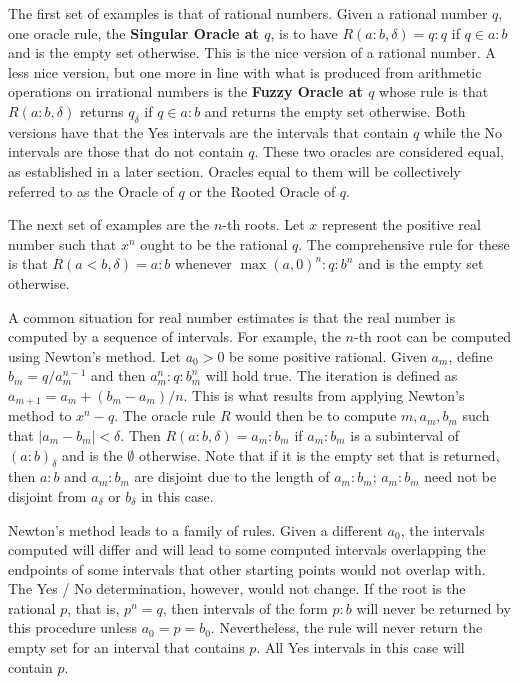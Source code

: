 \documentclass[12pt]{article}
\begin{document}
The first set of examples is that of rational numbers. Given a rational number $q$, one oracle rule, the \textbf{Singular Oracle at $q$}, is to have  $R(a:b, \delta) = q:q$ if $q \in a:b$ and is the empty set otherwise. This is the nice version of a rational number. A less nice version, but one more in line with what is produced from arithmetic operations on irrational numbers is the \textbf{Fuzzy Oracle at $q$} whose rule is that $R(a:b, \delta)$ returns $q_\delta$ if $q \in a:b$ and returns the empty set otherwise. Both versions have that the Yes intervals are the intervals that contain $q$ while the No intervals are those that do not contain $q$. These two oracles are considered equal, as established in a later section. Oracles equal to them will be collectively referred to as the Oracle of $q$ or the Rooted Oracle of $q$.  

The next set of examples are the $n$-th roots. Let $x$ represent the positive real number such that $x^n$ ought to be the rational $q$. The comprehensive rule for these is that $R(a\lt b, \delta) = a:b$ whenever $\max(a, 0)^n:q:b^n$ and is the empty set otherwise.

A common situation for real number estimates is that the real number is computed by a sequence of intervals. For example, the $n$-th root can be computed using Newton's method. Let $a_0 >0$ be some positive rational. Given $a_m$, define $b_m = q/a_m^{n-1}$ and then $a_m^n : q : b_m^n$ will hold true. The iteration is defined as $a_{m+1} = a_m + (b_m - a_m)/n$. This is what results from applying Newton's method to $x^n - q$. The oracle rule $R$ would then be to compute $m, a_m, b_m$ such that $|a_m - b_m| < \delta$.  Then $R(a:b, \delta) = a_m:b_m$ if $a_m:b_m$ is a subinterval of $(a:b)_\delta$ and is the $\emptyset$ otherwise. Note that if it is the empty set that is returned, then $a:b$ and $a_m:b_m$ are disjoint due to the length of $a_m:b_m$; $a_m:b_m$ need not be disjoint from $a_\delta$ or $b_\delta$ in this case. 

Newton's method leads to a family of rules. Given a different $a_0$, the intervals computed will differ and will lead to some computed intervals overlapping the endpoints of some intervals that other starting points would not overlap with. The Yes / No determination, however, would not  change. If the root is the rational $p$, that is, $p^n = q$,  then intervals of the form $p:b$ will never be returned by this procedure unless $a_0 = p = b_0$. Nevertheless, the rule will never return the empty set for an interval that contains $p$. All Yes intervals in this case will contain $p$. 
\end{document}
